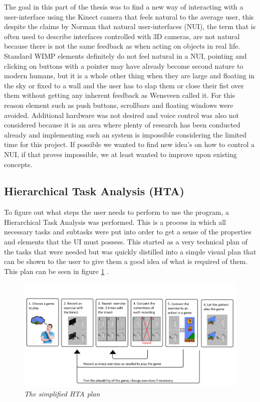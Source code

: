 The goal in this part of the thesis was to find a new way of interacting with a user-interface using the Kinect camera that feels natural to the average user, this despite the claims by Norman \cite{Norman2010} that natural user-interfaces (NUI), the term that is often used to describe interfaces controlled with 3D cameras, are not natural because there is not the same feedback as when acting on objects in real life. Standard WIMP elements definitely do not feel natural in a NUI, pointing and clicking on buttons with a pointer may have already become second nature to modern humans, but it is a whole other thing when they are large and floating in the sky or fixed to a wall and the user has to slap them or close their fist over them without getting any inherent feedback as Wensveen \cite{Wensveen2004} called it. For this reason element such as push buttons, scrollbars and floating windows were avoided. Additional hardware was not desired and voice control was also not considered because it is an area where plenty of research has been conducted already and implementing such an system is impossible considering the limited time for this project. If possible we wanted to find new idea's on how to control a NUI, if that proves impossible, we at least wanted to improve upon existing concepts.\\

\subsection{Hierarchical Task Analysis (HTA)}

To figure out what steps the user needs to perform to use the program, a Hierarchical Task Analysis was performed. This is a process in which all necessary tasks and subtasks were put into order to get a sense of the properties and elements that the UI must possess. This started as a very technical plan of the tasks that were needed but was quickly distilled into a simple visual plan that can be shown to the user to give them a good idea of what is required of them. This plan can be seen in figure \ref{HTA} .

\begin{figure}[H]
	\begin{center}
		\includegraphics[width=14cm]{figures/HTA_plan.png}
		\caption{\emph{The simplified HTA plan}}
		\label{HTA}
	\end{center}
\end{figure}

